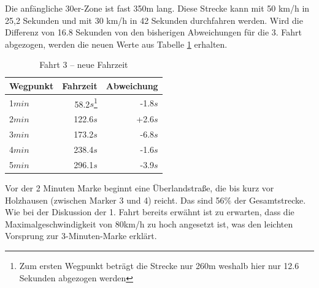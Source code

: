 Die anfängliche 30er-Zone ist fast 350m lang.
Diese Strecke kann mit 50 km/h in 25,2 Sekunden und mit 30 km/h in 42 Sekunden durchfahren werden.
Wird die Differenz von 16.8 Sekunden von den bisherigen Abweichungen für die 3. Fahrt abgezogen, werden die neuen Werte aus Tabelle \ref{tab:new3} erhalten.

\begin{table}[h]
\centering
\caption{Fahrt 3 -- neue Fahrzeit}
\label{tab:new3}
\begin{tabular}{|l|r|r|}
\hline
Wegpunkt & Fahrzeit & Abweichung \\ \hline 
1$min$ & 58.2$s$\footnote{Zum ersten Wegpunkt beträgt die Strecke nur 260m weshalb hier nur 12.6 Sekunden abgezogen werden} & -1.8$s$  \\
2$min$ & 122.6$s$ & +2.6$s$  \\
3$min$ & 173.2$s$ & -6.8$s$  \\
4$min$ & 238.4$s$ & -1.6$s$  \\
5$min$ & 296.1$s$ & -3.9$s$  \\
\hline
\end{tabular}
\end{table}

Vor der 2 Minuten Marke beginnt eine Überlandstraße, die bis kurz vor Holzhausen (zwischen Marker 3 und 4) reicht.
Das sind 56$\%$ der Gesamtstrecke.
Wie bei der Diskussion der 1. Fahrt bereits erwähnt ist zu erwarten, dass die Maximalgeschwindigkeit von 80km/h zu hoch angesetzt ist, was den leichten Vorsprung zur 3-Minuten-Marke erklärt.

